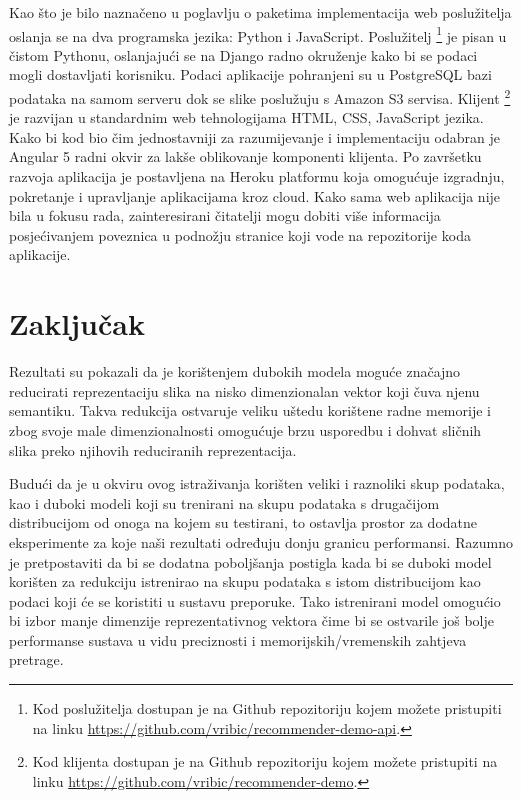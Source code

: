 \documentclass[times, utf8, proizvoljni, numeric]{fer}
\begin{document}
Kao što je bilo naznačeno u poglavlju o paketima implementacija web poslužitelja oslanja se na dva programska jezika: Python i JavaScript. Poslužitelj \footnote{Kod poslužitelja dostupan je na Github repozitoriju kojem možete pristupiti na linku \url{https://github.com/vribic/recommender-demo-api}.} je pisan u čistom Pythonu, oslanjajući se na Django radno okruženje kako bi se podaci mogli dostavljati korisniku. Podaci aplikacije pohranjeni su u PostgreSQL bazi podataka na samom serveru dok se slike poslužuju s Amazon S3 servisa. Klijent \footnote{Kod klijenta dostupan je na Github repozitoriju kojem možete pristupiti na linku \url{https://github.com/vribic/recommender-demo}.} je razvijan u standardnim web tehnologijama HTML, CSS, JavaScript jezika. Kako bi kod bio čim jednostavniji za razumijevanje i implementaciju odabran je Angular 5 radni okvir za lakše oblikovanje komponenti klijenta. Po završetku razvoja aplikacija je postavljena na Heroku platformu koja omogućuje izgradnju, pokretanje i upravljanje aplikacijama kroz cloud. Kako sama web aplikacija nije bila u fokusu rada, zainteresirani čitatelji mogu dobiti više informacija posjećivanjem poveznica u podnožju stranice koji vode na repozitorije koda aplikacije.



\chapter{Zaključak}

Rezultati su pokazali da je korištenjem dubokih modela moguće značajno reducirati reprezentaciju slika na nisko dimenzionalan vektor koji čuva njenu semantiku. Takva redukcija ostvaruje veliku uštedu korištene radne memorije i zbog svoje male dimenzionalnosti omogućuje brzu usporedbu i dohvat sličnih slika preko njihovih reduciranih reprezentacija. 

Budući da je u okviru ovog istraživanja korišten veliki i raznoliki skup podataka, kao i duboki modeli koji su trenirani na skupu podataka s drugačijom distribucijom od onoga na kojem su testirani, to ostavlja prostor za dodatne eksperimente za koje naši rezultati određuju donju granicu performansi. Razumno je pretpostaviti da bi se dodatna poboljšanja postigla kada bi se duboki model korišten za redukciju istrenirao na skupu podataka s istom distribucijom kao podaci koji će se koristiti u sustavu preporuke. Tako istrenirani model omogućio bi izbor manje dimenzije reprezentativnog vektora čime bi se ostvarile još bolje performanse sustava u vidu preciznosti i memorijskih/vremenskih zahtjeva pretrage.
\end{document}
